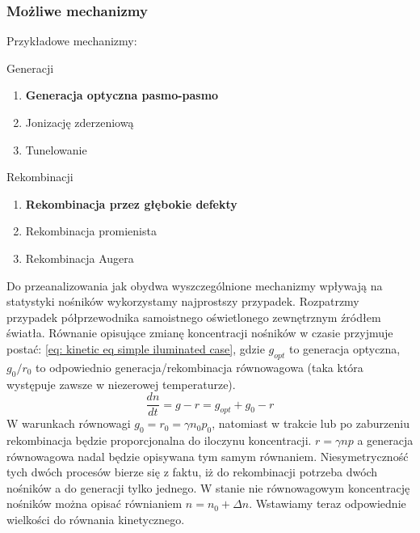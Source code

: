         \subsubsection{Możliwe mechanizmy}
            Przykładowe mechanizmy:
            \begin{center}
                \begin{minipage}[t]{0.49\textwidth}
                    \centering
                    Generacji
                    \begin{enumerate}
                        \item \textbf{Generacja optyczna pasmo-pasmo}
                        \item Jonizację zderzeniową
                        \item Tunelowanie
                    \end{enumerate}
                \end{minipage}
                \hfill
                \begin{minipage}[t]{0.49\textwidth}
                    \centering
                    Rekombinacji
                    \begin{enumerate}
                        \item \textbf{Rekombinacja przez głębokie defekty}
                        \item Rekombinacja promienista
                        \item Rekombinacja Augera
                    \end{enumerate}
                \end{minipage}
            \end{center}
            Do przeanalizowania jak obydwa wyszczególnione mechanizmy wpływają na statystyki nośników wykorzystamy najprostszy przypadek. Rozpatrzmy przypadek półprzewodnika samoistnego oświetlonego zewnętrznym źródłem światła. Równanie opisujące zmianę koncentracji nośników w czasie przyjmuje postać: \ref{eq: kinetic eq simple iluminated case}, gdzie $g_{opt}$ to generacja optyczna, $g_0/r_0$ to odpowiednio generacja/rekombinacja równowagowa (taka która występuje zawsze w niezerowej temperaturze).
            \begin{equation}
                \frac{dn}{dt} = g - r = g_{opt} + g_0 - r\label{eq: kinetic eq simple iluminated case}
            \end{equation}
            W warunkach równowagi $g_0 = r_0 = \gamma n_0p_0$, natomiast w trakcie lub po zaburzeniu rekombinacja będzie proporcjonalna do iloczynu koncentracji. $r = \gamma np$ a generacja równowagowa nadal będzie opisywana tym samym równaniem. Niesymetryczność tych dwóch procesów bierze się z faktu, iż do rekombinacji potrzeba dwóch nośników a do generacji tylko jednego. W stanie nie równowagowym koncentrację nośników można opisać równianiem $n = n_0 + \Delta n$. Wstawiamy teraz odpowiednie wielkości do równania kinetycznego.
